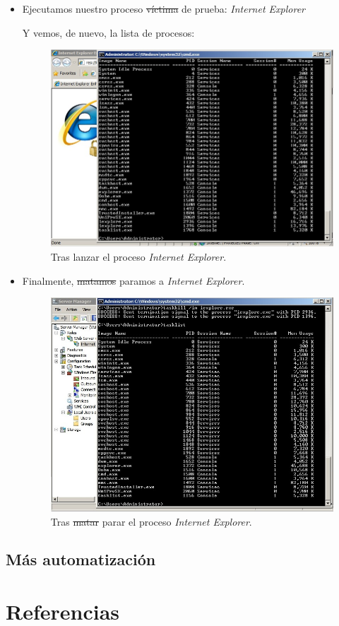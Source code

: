 \documentclass[paper=a4, fontsize=11pt]{scrartcl} %
\numberwithin{equation}{section} %
\numberwithin{figure}{section} %
\numberwithin{table}{section} %
\begin{document}
\begin{enumerate}
\begin{itemize}
			\item Ejecutamos nuestro proceso \sout{víctima} de prueba: \textit{Internet Explorer}
			
			Y vemos, de nuevo, la lista de procesos:
			
			\begin{figure}[H]
				\centering
				\includegraphics[width=15cm]{Ejercicio_25b.jpg}
				\caption{Tras lanzar el proceso \textit{Internet Explorer}.}
				\label{fig:born}
			\end{figure}
			
			\item Finalmente, \sout{matamos} paramos a \textit{Internet Explorer}.
			
			\begin{figure}[H]
				\centering
				\includegraphics[width=15cm]{Ejercicio_25c.jpg}
				\caption{Tras \sout{matar} parar el proceso \textit{Internet Explorer}.}
				\label{fig:die}
			\end{figure}
		\end{itemize}
		
	\subsection{Más automatización}
\end{enumerate}

\newpage
\section{Referencias}

\end{document}
